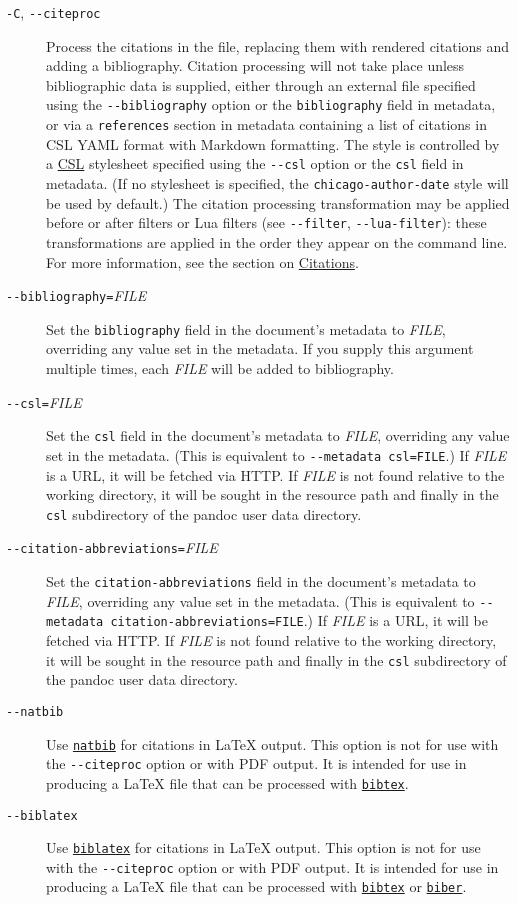 \documentclass[]{article}
\begin{document}
\begin{description}
\item[\texttt{-C}, \texttt{-\/-citeproc}]
Process the citations in the file, replacing them with rendered
citations and adding a bibliography. Citation processing will not take
place unless bibliographic data is supplied, either through an external
file specified using the \texttt{-\/-bibliography} option or the
\texttt{bibliography} field in metadata, or via a \texttt{references}
section in metadata containing a list of citations in CSL YAML format
with Markdown formatting. The style is controlled by a
\href{https://docs.citationstyles.org/en/stable/specification.html}{CSL}
stylesheet specified using the \texttt{-\/-csl} option or the
\texttt{csl} field in metadata. (If no stylesheet is specified, the
\texttt{chicago-author-date} style will be used by default.) The
citation processing transformation may be applied before or after
filters or Lua filters (see \texttt{-\/-filter},
\texttt{-\/-lua-filter}): these transformations are applied in the order
they appear on the command line. For more information, see the section
on \protect\hyperlink{citations}{Citations}.
\item[\texttt{-\/-bibliography=}\emph{FILE}]
Set the \texttt{bibliography} field in the document's metadata to
\emph{FILE}, overriding any value set in the metadata. If you supply
this argument multiple times, each \emph{FILE} will be added to
bibliography.
\item[\texttt{-\/-csl=}\emph{FILE}]
Set the \texttt{csl} field in the document's metadata to \emph{FILE},
overriding any value set in the metadata. (This is equivalent to
\texttt{-\/-metadata\ csl=FILE}.) If \emph{FILE} is a URL, it will be
fetched via HTTP. If \emph{FILE} is not found relative to the working
directory, it will be sought in the resource path and finally in the
\texttt{csl} subdirectory of the pandoc user data directory.
\item[\texttt{-\/-citation-abbreviations=}\emph{FILE}]
Set the \texttt{citation-abbreviations} field in the document's metadata
to \emph{FILE}, overriding any value set in the metadata. (This is
equivalent to \texttt{-\/-metadata\ citation-abbreviations=FILE}.) If
\emph{FILE} is a URL, it will be fetched via HTTP. If \emph{FILE} is not
found relative to the working directory, it will be sought in the
resource path and finally in the \texttt{csl} subdirectory of the pandoc
user data directory.
\item[\texttt{-\/-natbib}]
Use \href{https://ctan.org/pkg/natbib}{\texttt{natbib}} for citations in
LaTeX output. This option is not for use with the \texttt{-\/-citeproc}
option or with PDF output. It is intended for use in producing a LaTeX
file that can be processed with
\href{https://ctan.org/pkg/bibtex}{\texttt{bibtex}}.
\item[\texttt{-\/-biblatex}]
Use \href{https://ctan.org/pkg/biblatex}{\texttt{biblatex}} for
citations in LaTeX output. This option is not for use with the
\texttt{-\/-citeproc} option or with PDF output. It is intended for use
in producing a LaTeX file that can be processed with
\href{https://ctan.org/pkg/bibtex}{\texttt{bibtex}} or
\href{https://ctan.org/pkg/biber}{\texttt{biber}}.
\end{description}
\end{document}
